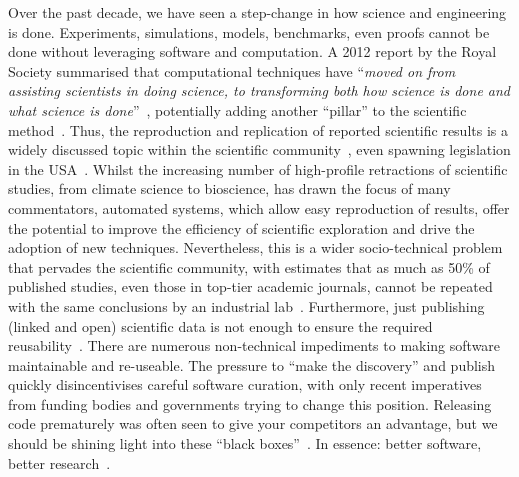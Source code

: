 \documentclass[conference]{IEEEtran}
\begin{document}
Over the past decade, we have seen a step-change in how science and
engineering is done. Experiments, simulations, models, benchmarks,
even proofs cannot be done without leveraging software and
computation. A 2012 report by the Royal Society summarised that
computational techniques have ``{\emph{moved on from assisting
scientists in doing science, to transforming both how science is done
and what science is done}}''~\cite{rssaaoe:2012}, potentially adding
another ``pillar'' to the scientific
method~\cite{hey:2009,vardi-cacm-2010}. Thus, the reproduction and
replication of reported scientific results is a widely discussed topic
within the scientific
community~\cite{schwab-et-al:2000,barnes:2010,mesirov:2010,morin-et-al:2012,joppa-et-al:2013},
even spawning legislation in the USA~\cite{hr4012:2014}.  Whilst the
increasing number of high-profile retractions of scientific studies,
from climate science to bioscience, has drawn the focus of many
commentators, automated systems, which allow easy reproduction of
results, offer the potential to improve the efficiency of scientific
exploration and drive the adoption of new techniques. Nevertheless,
this is a wider socio-technical problem that pervades the scientific
community, with estimates that as much as 50\% of published studies,
even those in top-tier academic journals, cannot be repeated with the
same conclusions by an industrial
lab~\cite{osherovich:2011}. Furthermore, just publishing (linked and
open) scientific data is not enough to ensure the required
reusability~\cite{bechhofer-et-al:2013}. There are numerous
non-technical impediments to making software maintainable and
re-useable. The pressure to ``make the discovery'' and publish quickly
disincentivises careful software curation, with only recent
imperatives from funding bodies and governments trying to change this
position. Releasing code prematurely was often seen to give your
competitors an advantage, but we should be shining light into these
``black boxes''~\cite{morin-et-al:2012}. In essence: better software,
better research~\cite{goble:2014}.
\end{document}
